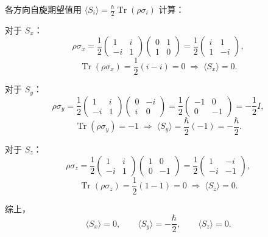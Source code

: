 \begin{solution}
各方向自旋期望值用 $\langle S_i\rangle = \frac{\hbar}{2}\operatorname{Tr}(\rho\sigma_i)$ 计算：

对于 $S_x$：
\[
\rho\sigma_x = \frac{1}{2}\begin{pmatrix}1&i\\-i&1\end{pmatrix}\begin{pmatrix}0&1\\1&0\end{pmatrix}
= \frac{1}{2}\begin{pmatrix}i&1\\1&-i\end{pmatrix},
\]
\[
\operatorname{Tr}(\rho\sigma_x) = \frac{1}{2}(i - i) = 0
\;\Longrightarrow\; \langle S_x\rangle = 0.
\]

对于 $S_y$：
\[
\rho\sigma_y = \frac{1}{2}\begin{pmatrix}1&i\\-i&1\end{pmatrix}\begin{pmatrix}0&-i\\i&0\end{pmatrix}
= \frac{1}{2}\begin{pmatrix}-1&0\\0&-1\end{pmatrix} = -\frac{1}{2}I,
\]
\[
\operatorname{Tr}(\rho\sigma_y) = -1
\;\Longrightarrow\; \langle S_y\rangle = \frac{\hbar}{2}(-1) = -\frac{\hbar}{2}.
\]

对于 $S_z$：
\[
\rho\sigma_z = \frac{1}{2}\begin{pmatrix}1&i\\-i&1\end{pmatrix}\begin{pmatrix}1&0\\0&-1\end{pmatrix}
= \frac{1}{2}\begin{pmatrix}1&-i\\-i&-1\end{pmatrix},
\]
\[
\operatorname{Tr}(\rho\sigma_z) = \frac{1}{2}(1-1) = 0
\;\Longrightarrow\; \langle S_z\rangle = 0.
\]

综上，
\[
\boxed{\langle S_x\rangle = 0,\qquad \langle S_y\rangle = -\frac{\hbar}{2},\qquad \langle S_z\rangle = 0.}
\]


\end{solution}
